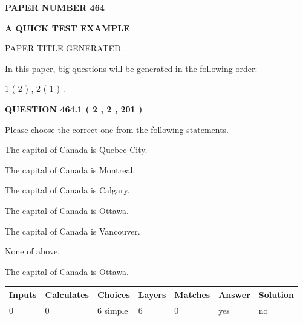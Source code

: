 \documentclass[12pt]{article}
\begin{document}
   
   
   
 {\textbf{ \Large{ PAPER NUMBER  464  }}}
   
   
\vspace{0.2in}
   
   
   
   
   
   
   
   
 \vspace{0.2in}
{\LARGE {\textbf{ A QUICK TEST EXAMPLE}}}
   
   
 PAPER TITLE GENERATED.
   
   
   
\vspace{0.2in}
   
In this paper, big questions will be generated in the following order: 
   
   
   1 ( 2 )
 ,
   2 ( 1 )
 .
  
\vspace{0.2in}
  
{\textbf{\Large{QUESTION
464.1 
 ( 2 , 2 , 201 )
}}}
  
  
Please choose the correct one from the following statements.
 
 
The capital of Canada is Quebec City.
 
 
The capital of Canada is Montreal.
 
 
The capital of Canada is Calgary.
 
 
The capital of Canada is Ottawa.
 
 
The capital of Canada is Vancouver.
 
 
 None of above.
 
 
\noindent{}
 
 
The capital of Canada is Ottawa.
 
 
\noindent{}
 
 
   
   
   
   
\noindent\begin{tabular}{|l|l|l|l|l|l|l|}
 \hline
Inputs & Calculates & Choices & Layers & Matches & Answer & Solution \\ \hline
 0  & 
 0  & 
 6
  simple  
  & 
 6  & 
 0  & 
  yes & 
  no 
  \\ \hline
 \end{tabular}
   
\end{document}
